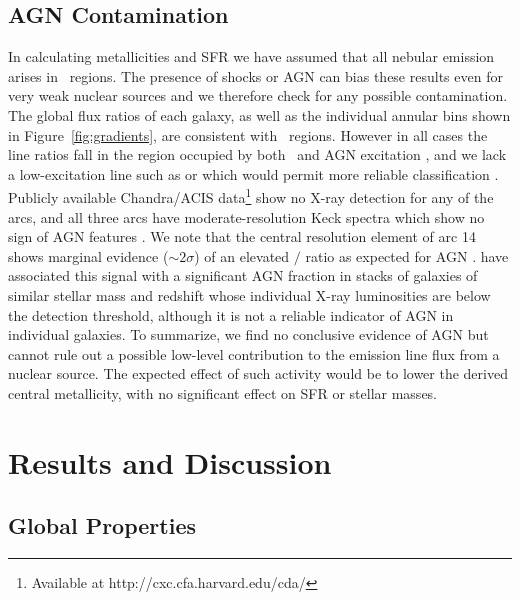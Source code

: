 \subsection{AGN Contamination}

In calculating metallicities and SFR we have assumed that all nebular emission arises in \HII\ regions. The
presence of shocks or AGN can bias these results even for very weak nuclear sources and we therefore check for
any possible contamination. The global flux ratios of each galaxy, as well as the individual annular bins shown
in Figure~\ref{fig:gradients}, are consistent with \HII\ regions. However in all cases the line ratios fall in
the region occupied by both \HII\ and AGN excitation \citep[such as the "blue" diagnostic diagram,
e.g.,][]{Lamareille2010}, and we lack a low-excitation line such as \NII or \SII which would permit more
reliable classification \citep[e.g.,][]{Jones2013}. Publicly available Chandra/ACIS data\footnote{Available at
http://cxc.cfa.harvard.edu/cda/} show no X-ray detection for any of the arcs, and all three arcs have
moderate-resolution Keck spectra which show no sign of AGN features \citep{Schmidt2014,Limousin2012}. We note
that the central resolution element of arc 14 shows marginal evidence ($\sim2\sigma$) of an elevated \OIII$/$\Hb
ratio as expected for AGN \citep[e.g.,][]{Wright2010,Newman2014}.  \cite{Trump2011} have associated this signal
with a significant AGN fraction in stacks of galaxies of similar stellar mass and redshift whose individual X-ray
luminosities are below the detection threshold, although it is not a reliable indicator of AGN in individual
galaxies.  To summarize, we find no conclusive evidence of AGN but cannot rule out a possible low-level
contribution to the emission line flux from a nuclear source. The expected effect of such activity would be to
lower the derived central metallicity, with no significant effect on SFR or stellar masses.




\section{Results and Discussion}\label{sec:results}

\subsection{Global Properties}

